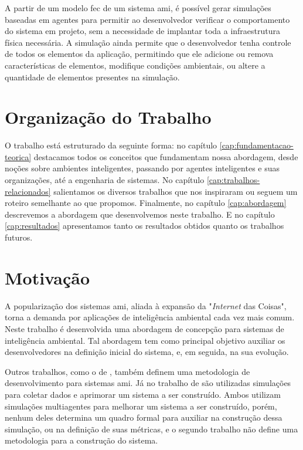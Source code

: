     A partir de um modelo \acrshort{fec} de um sistema \acrshort{ami}, é possível gerar simulações baseadas em agentes para permitir ao desenvolvedor verificar o comportamento do sistema em projeto, sem a necessidade de implantar toda a infraestrutura física necessária. A simulação ainda permite que o desenvolvedor tenha controle de todos os elementos da aplicação, permitindo que ele adicione ou remova características de elementos, modifique condições ambientais, ou altere a quantidade de elementos presentes na simulação.

\section{Organização do Trabalho}
    
O trabalho está estruturado da seguinte forma: no capítulo \ref{cap:fundamentacao-teorica} destacamos todos os conceitos que fundamentam nossa abordagem, desde noções sobre ambientes inteligentes, passando por agentes inteligentes e suas organizações, até a engenharia de sistemas. No capítulo \ref{cap:trabalhos-relacionados} salientamos os diversos trabalhos que nos inspiraram ou seguem um roteiro semelhante ao que propomos. Finalmente, no capítulo \ref{cap:abordagem} descrevemos a abordagem que desenvolvemos neste trabalho. E no capítulo \ref{cap:resultados} apresentamos tanto os resultados obtidos quanto os trabalhos futuros. 
    
\section{Motivação}
\label{sec:motivacao}


A popularização dos sistemas \acrshort{ami}, aliada à expansão da "\textit{Internet} das Coisas", torna a demanda por aplicações de inteligência ambiental cada vez mais comum. 
Neste trabalho é desenvolvida uma abordagem de concepção para sistemas de inteligência ambiental. Tal abordagem tem como principal objetivo auxiliar os desenvolvedores na definição inicial do sistema, e, em seguida, na sua evolução. 
 
Outros trabalhos, como o de , também definem uma metodologia de desenvolvimento para sistemas \acrshort{ami}. Já no trabalho de  são utilizadas simulações para coletar dados e aprimorar um sistema a ser construído. Ambos utilizam simulações multiagentes para melhorar um sistema a ser construído, porém, nenhum deles determina um quadro formal para auxiliar na construção dessa simulação, ou na definição de suas métricas, e o segundo trabalho não define uma metodologia para a construção do sistema. 

